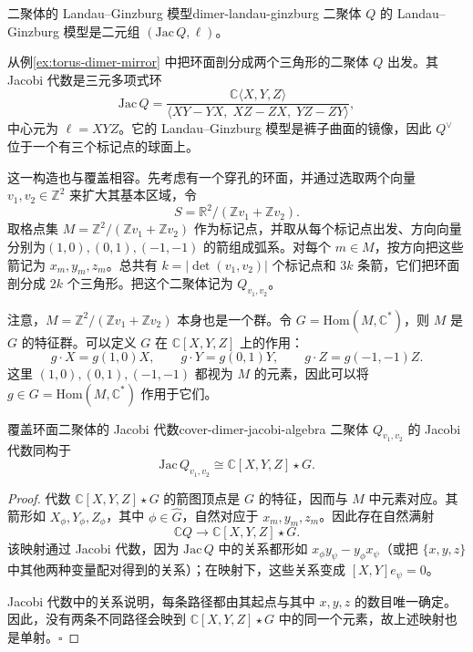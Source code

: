 \begin{definition}{二聚体的 Landau--Ginzburg 模型}{dimer-landau-ginzburg}
二聚体 $Q$ 的 Landau--Ginzburg 模型是二元组 $(\mathrm{Jac}\,Q,\ell)$。
\end{definition}

\begin{example}
从例\ref{ex:torus-dimer-mirror} 中把环面剖分成两个三角形的二聚体 $Q$ 出发。其 Jacobi 代数是三元多项式环
\[
  \mathrm{Jac}\,Q=
  \frac{\mathbb C\langle X,Y,Z\rangle}
       {\langle XY-YX,\;XZ-ZX,\;YZ-ZY\rangle},
\]
中心元为 $\ell=XYZ$。它的 Landau--Ginzburg 模型是裤子曲面的镜像，因此 $Q^\vee$ 位于一个有三个标记点的球面上。
\end{example}

这一构造也与覆盖相容。先考虑有一个穿孔的环面，并通过选取两个向量 $v_1,v_2\in\mathbb Z^2$ 来扩大其基本区域，令
\[
  S=\mathbb R^2/(\mathbb Z v_1+\mathbb Z v_2).
\]
取格点集 $M=\mathbb Z^2/(\mathbb Z v_1+\mathbb Z v_2)$ 作为标记点，\linebreak[3] 并取从每个标记点出发、方向向量分别为\linebreak $(1,0),(0,1),(-1,-1)$ 的箭组成弧系。对每个 $m\in M$，按方向把这些箭记为 $x_m,y_m,z_m$。总共有 $k=|\det(v_1,v_2)|$ 个标记点和 $3k$ 条箭，它们把环面剖分成 $2k$ 个三角形。把这个二聚体记为 $Q_{v_1,v_2}$。

注意，$M=\mathbb Z^2/(\mathbb Z v_1+\mathbb Z v_2)$ 本身也是一个群。令 $G=\mathrm{Hom}(M,\mathbb C^*)$，则 $M$ 是 $G$ 的特征群。可以定义 $G$ 在 $\mathbb C[X,Y,Z]$ 上的作用：
\[
  g\cdot X=g(1,0)X,\qquad
  g\cdot Y=g(0,1)Y,\qquad
  g\cdot Z=g(-1,-1)Z.
\]
这里 $(1,0),(0,1),(-1,-1)$ 都视为 $M$ 的元素，因此可以将 $g\in G=\mathrm{Hom}(M,\mathbb C^*)$ 作用于它们。

\begin{lemma}{覆盖环面二聚体的 Jacobi 代数}{cover-dimer-jacobi-algebra}
二聚体 $Q_{v_1,v_2}$ 的 Jacobi 代数同构于
\[
  \mathrm{Jac}\,Q_{v_1,v_2}\cong\mathbb C[X,Y,Z]\star G.
\]
\end{lemma}
\begin{proof}
代数 $\mathbb C[X,Y,Z]\star G$ 的箭图顶点是 $G$ 的特征，因而与 $M$ 中元素对应。其箭形如 $X_\phi,Y_\phi,Z_\phi$，其中 $\phi\in\widehat G$，自然对应于 $x_m,y_m,z_m$。因此存在自然满射
\[
  \mathbb C Q\longrightarrow\mathbb C[X,Y,Z]\star G.
\]
该映射通过 Jacobi 代数，因为 $\mathrm{Jac}\,Q$ 中的关系都形如 $x_\phi y_\psi-y_\phi x_\psi$（或把 $\{x,y,z\}$ 中其他两种变量配对得到的关系）；在映射下，这些关系变成 $[X,Y]e_\psi=0$。

Jacobi 代数中的关系说明，每条路径都由其起点与其中 $x,y,z$ 的数目唯一确定。因此，没有两条不同路径会映到 $\mathbb C[X,Y,Z]\star G$ 中的同一个元素，故上述映射也是单射。\hfill$\square$
\end{proof}

